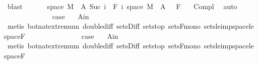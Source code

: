 \begin{isabellebody}
\ blast\isanewline
\ \ \isamarkupfalse%
\ \isamarkupfalse%
\ {\isacharasterisk}{\kern0pt}{\isacharcolon}{\kern0pt}\ {\isachardoublequoteopen}{\isacharparenleft}{\kern0pt}space\ M\ {\isacharminus}{\kern0pt}\ A\ {\isacharparenleft}{\kern0pt}Suc\ i{\isacharparenright}{\kern0pt}{\isacharparenright}{\kern0pt}\ {\isasymin}\ F\ i{\isachardoublequoteclose}\ {\isachardoublequoteopen}{\isacharparenleft}{\kern0pt}space\ M\ {\isacharminus}{\kern0pt}\ A\ {}{\isacharparenright}{\kern0pt}\ {\isasymin}\ F\ {}{\isachardoublequoteclose}\ \isamarkupfalse%
\ Compl{\isacharparenleft}{\kern0pt}{}{\isacharcomma}{\kern0pt}{}{\isacharparenright}{\kern0pt}\ \isamarkupfalse%
\ auto\isanewline
\ \ \isacommand{{\isacharbraceleft}{\kern0pt}}\isamarkupfalse%
\isanewline
\ \ \ \ \isamarkupfalse%
\ {}\isanewline
\ \ \ \ \isamarkupfalse%
\ \isamarkupfalse%
\ {\isacharquery}{\kern0pt}case\ \isamarkupfalse%
\ {\isacharasterisk}{\kern0pt}\ A{\isacharunderscore}{\kern0pt}in\ \isamarkupfalse%
\ {\isacharparenleft}{\kern0pt}metis\ bot{\isacharunderscore}{\kern0pt}nat{\isacharunderscore}{\kern0pt}{}{\isachardot}{\kern0pt}extremum\ double{\isacharunderscore}{\kern0pt}diff\ sets{\isachardot}{\kern0pt}Diff\ sets{\isachardot}{\kern0pt}top\ sets{\isacharunderscore}{\kern0pt}F{\isacharunderscore}{\kern0pt}mono\ sets{\isacharunderscore}{\kern0pt}le{\isacharunderscore}{\kern0pt}imp{\isacharunderscore}{\kern0pt}space{\isacharunderscore}{\kern0pt}le\ space{\isacharunderscore}{\kern0pt}F{\isacharparenright}{\kern0pt}\isanewline
\ \isamarkupfalse%
\isanewline
\ \ \ \ \isamarkupfalse%
\ {}\isanewline
\ \ \ \ \isamarkupfalse%
\ \isamarkupfalse%
\ {\isacharquery}{\kern0pt}case\ \isamarkupfalse%
\ {\isacharasterisk}{\kern0pt}\ A{\isacharunderscore}{\kern0pt}in\ \isamarkupfalse%
\ {\isacharparenleft}{\kern0pt}metis\ bot{\isacharunderscore}{\kern0pt}nat{\isacharunderscore}{\kern0pt}{}{\isachardot}{\kern0pt}extremum\ double{\isacharunderscore}{\kern0pt}diff\ sets{\isachardot}{\kern0pt}Diff\ sets{\isachardot}{\kern0pt}top\ sets{\isacharunderscore}{\kern0pt}F{\isacharunderscore}{\kern0pt}mono\ sets{\isacharunderscore}{\kern0pt}le{\isacharunderscore}{\kern0pt}imp{\isacharunderscore}{\kern0pt}space{\isacharunderscore}{\kern0pt}le\ space{\isacharunderscore}{\kern0pt}F{\isacharparenright}{\kern0pt}\isanewline

\end{isabellebody}

